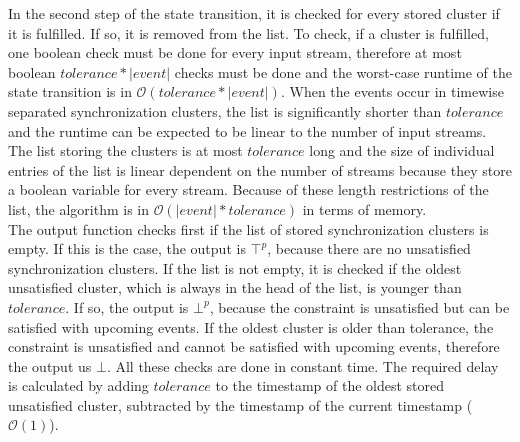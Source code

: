 	In the second step of the state transition, it is checked for every stored cluster if it is fulfilled. If so, it is removed from the list. To check, if a cluster is fulfilled, one boolean check must be done for every input stream, therefore at most boolean $tolerance*|event|$ checks must be done and the worst-case runtime of the state transition is in $\mathcal{O}(tolerance * |event|)$. When the events occur in timewise separated synchronization clusters, the list is significantly shorter than $tolerance$ and the runtime can be expected to be linear to the number of input streams.\\
	The list storing the clusters is at most $tolerance$ long and the size of individual entries of the list is linear dependent on the number of streams because they store a boolean variable for every stream. Because of these length restrictions of the list, the algorithm is in $\mathcal{O}(|event|*tolerance)$ in terms of memory.\\
	The output function checks first if the list of stored synchronization clusters is empty. If this is the case, the output is $\top^p$, because there are no unsatisfied synchronization clusters. If the list is not empty, it is checked if the oldest unsatisfied cluster, which is always in the head of the list, is younger than $tolerance$. If so, the output is $\bot^p$, because the constraint is unsatisfied but can be satisfied with upcoming events. If the oldest cluster is older than tolerance, the constraint is unsatisfied and cannot be satisfied with upcoming events, therefore the output us $\bot$. All these checks are done in constant time. The required delay is calculated by adding $tolerance$ to the timestamp of the oldest stored unsatisfied cluster, subtracted by the timestamp of the current timestamp ($\mathcal{O}(1)$).
	
